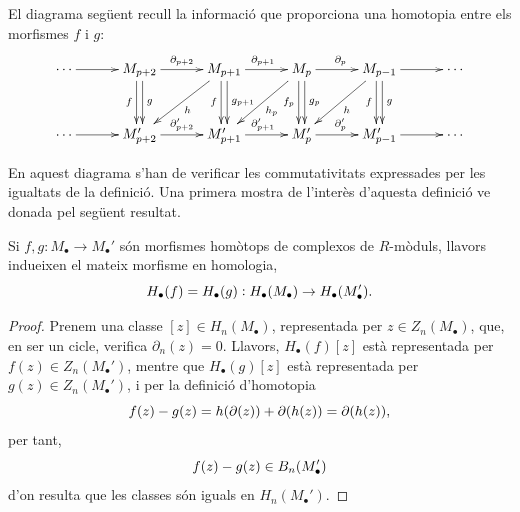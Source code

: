 \documentclass[../main.tex]{subfiles}
\begin{document}
El diagrama següent recull la informació que proporciona una homotopia entre els morfismes $f$ i $g$:
\begin{equation}
    \notag
    \xymatrix@=3em{
    \cdots \ar[r] & M_{p+2}\ar[r]^{\partial_{p+2}}\ar@<-.5ex>[d]_f\ar@<.5ex>[d]^g & M_{p+1}\ar[r]^{\partial_{p+1}}\ar@<-.5ex>[d]_f\ar@<.5ex>[d]^{g_{p+1}}\ar[dl]^h & M_p\ar[r]^{\partial_p}\ar@<-.5ex>[d]_{f_p}\ar@<.5ex>[d]^{g_p}\ar[dl]^{h_p} & M_{p-1}\ar[r]\ar@<-.5ex>[d]_f\ar@<.5ex>[d]^g\ar[dl]^h & \cdots \\
    \cdots \ar[r] & M_{p+2}'\ar[r]^{\partial_{p+2}'} & M_{p+1}'\ar[r]^{\partial_{p+1}'} & M_p'\ar[r]^{\partial_p'} & M_{p-1}'\ar[r] & \cdots
    }
\end{equation}

En aquest diagrama s'han de verificar les commutativitats expressades per les igualtats de la definició. Una primera mostra de l'interès d'aquesta definició ve donada pel següent resultat.

\begin{prop}
Si $f,g:M_\bullet\rightarrow M_\bullet'$ són morfismes homòtops de complexos de $R$-mòduls, llavors indueixen el mateix morfisme en homologia,
\begin{equation}
    \notag
    H_\bullet(f) = H_\bullet(g):H_\bullet(M_\bullet)\rightarrow H_\bullet(M_\bullet').
\end{equation}
\end{prop}
\begin{proof}
Prenem una classe $[z]\in H_n(M_\bullet)$, representada per $z\in Z_n(M_\bullet)$, que, en ser un cicle, verifica $\partial_n(z) = 0$. Llavors, $H_\bullet(f)[z]$ està representada per $f(z)\in Z_n(M_\bullet')$, mentre que $H_\bullet(g)[z]$ està representada per $g(z)\in Z_n(M_\bullet')$, i per la definició d'homotopia
\begin{equation}
    \notag
    f(z)-g(z) = h(\partial(z))+\partial(h(z)) = \partial(h(z)),
\end{equation}
per tant,
\begin{equation}
    \notag
    f(z)-g(z)\in B_n(M_\bullet')
\end{equation}
d'on resulta que les classes són iguals en $H_n(M_\bullet')$.
\end{proof}
\end{document}
